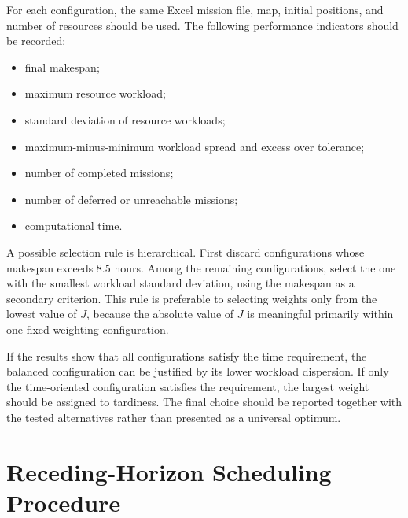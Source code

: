 For each configuration, the same Excel mission file, map, initial positions,
and number of resources should be used. The following performance indicators
should be recorded:
\begin{itemize}
	\item final makespan;
	\item maximum resource workload;
	\item standard deviation of resource workloads;
	\item maximum-minus-minimum workload spread and excess over tolerance;
	\item number of completed missions;
	\item number of deferred or unreachable missions;
	\item computational time.
\end{itemize}

A possible selection rule is hierarchical. First discard configurations whose
makespan exceeds $8.5$ hours. Among the remaining configurations, select the
one with the smallest workload standard deviation, using the makespan as a
secondary criterion. This rule is preferable to selecting weights only from
the lowest value of $J$, because the absolute value of $J$ is meaningful
primarily within one fixed weighting configuration.

If the results show that all configurations satisfy the time requirement,
the balanced configuration can be justified by its lower workload dispersion.
If only the time-oriented configuration satisfies the requirement, the
largest weight should be assigned to tardiness. The final choice should be
reported together with the tested alternatives rather than presented as a
universal optimum.

\section{Receding-Horizon Scheduling Procedure}

